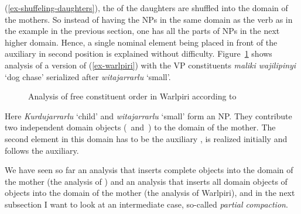 \documentclass[output=paper
                ,modfonts
                ,nonflat
	        ,collection
	        ,collectionchapter
	        ,collectiontoclongg
 	        ,biblatex
                ,babelshorthands
                ,newtxmath
                ,draftmode
                ,colorlinks, citecolor=brown
]{./langsci/langscibook}
\begin{document}
(\ref{ex-shuffeling-daughters}), the \domvs of the daughters are shuffled into the domain of the
mothers. So instead of having the NPs in the same domain as the verb as in the  example in the
previous section, one has all the parts of NPs in the next higher domain. Hence, a single nominal element
being placed in front of the auxiliary in second position is explained without
difficulty. Figure~\ref{fig-warlpiri} shows  analysis of a version of
(\ref{ex-warlpiri}) with the VP constituents \emph{maliki wajilipinyi} `dog chase' serialized after \emph{witajarrarlu} `small'.
\begin{figure}
\caption{\label{fig-warlpiri}Analysis of free constituent order in Warlpiri according to
  \citet[]{DS99a}}
\end{figure}
Here \emph{Kurdujarrarlu} `child' and \emph{witajarrarlu} `small' form an NP. They contribute two independent domain objects (\,
and \,) to the domain of the mother. The second element in this domain has to be the auxiliary
,  is realized initially and  follows the auxiliary.

We have seen so far an analysis that inserts complete objects into the domain of the mother (the
analysis of ) and an analysis that inserts all domain objects of objects into the domain of the
mother (the analysis of Warlpiri), and in the next
subsection I want to look at an intermediate case, so-called \emph{partial compaction}.
\end{document}
